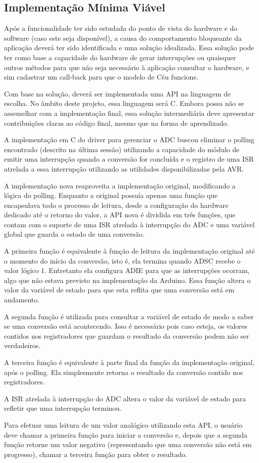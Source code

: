 \documentclass{article}
\begin{document}
\subsection{Implementação Mínima Viável}
\tab Após a funcionalidade ter sido estudada do ponto de vista do hardware e do software (caso este seja
disponível), a causa do comportamento bloqueante da aplicação deverá ter sido identificada e uma
solução idealizada. Essa solução pode ter como base a capacidade do hardware de gerar interrupções
ou quaisquer outros métodos para que não seja necessário à aplicação consultar o hardware, e sim
cadastrar um call-back para que o modelo de Céu funcione.
\par Com base na solução, deverá ser implementada uma API na linguagem de escolha. No âmbito deste
projeto, essa linguagem será C. Embora possa não se assemelhar com a implementação final, essa
solução intermediária deve apresentar contribuições claras ao código final, mesmo que na forma de
aprendizado.
\par A implementação em C do driver para gerenciar o ADC buscou eliminar o polling encontrado (descrito
na última sessão) utilizando a capacidade do módulo de emitir uma interrupção quando a conversão
for concluída e o registro de uma ISR atrelada a essa interrupção utilizando as utilidades
disponibilizadas pela AVR.
\par A implementação nova reaproveita a implementação original, modificando a lógica do polling.
Enquanto a original possuía apenas uma função que encapsulava todo o processo de leitura, desde a
configuração do hardware dedicado até o retorno do valor, a API nova é dividida em três funções, que
contam com o suporte de uma ISR atrelada à interrupção do ADC e uma variável global que guarda
o estado de uma conversão.
\par A primeira função é equivalente à função de leitura da implementação original até o momento do
início da conversão, isto é, ela termina quando ADSC recebe o valor lógico 1. Entretanto ela
configura ADIE para que as interrupções ocorram, algo que não estava previsto na implementação
da Arduino. Essa função altera o valor da variável de estado para que esta reflita que uma conversão
está em andamento.
\par A segunda função é utilizada para consultar a variável de estado de modo a saber se uma conversão
está acontecendo. Isso é necessário pois caso esteja, os valores contidos nos registradores que
guardam o resultado da conversão podem não ser verdadeiros.
\par A terceira função é equivalente à parte final da função da implementação original, após o polling. Ela
simplesmente retorna o resultado da conversão contido nos registradores.
\par A ISR atrelada à interrupção do ADC altera o valor da variável de estado para refletir que uma
interrupção terminou.
\par Para efetuar uma leitura de um valor analógico utilizando esta API, o usuário deve chamar a primeira
função para iniciar a conversão e, depois que a segunda função retorne um valor negativo
(representando que uma conversão não está em progresso), chamar a terceira função para obter o
resultado.
\end{document}
